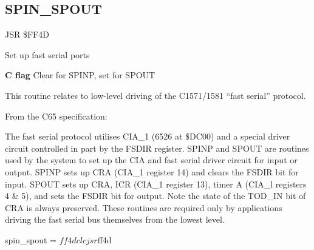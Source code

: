 \subsection{SPIN{\_}SPOUT}
\label{KERNAL Jump Table!SPIN_SPOUT}
\begin{description}[leftmargin=2cm,style=nextline]
    \item [Address:] JSR \$FF4D
    \item [Description:] Set up fast serial ports
    \item [Inputs:]
        \textbf{C flag} Clear for SPINP, set for SPOUT
    \item [Remarks:]
    This routine relates to low-level driving of the C1571/1581 ``fast serial'' protocol.

    From the C65 specification:

    The  fast serial protocol utilises CIA\_1 (6526 at \$DC00) and a special
    driver  circuit  controlled  in  part by the FSDIR register. SPINP and
    SPOUT  are  routines  used  by  the  system to set up the CIA and fast
    serial  driver  circuit  for input or output. SPINP sets up CRA (CIA\_1
    register  14)  and  clears the FSDIR bit for input. SPOUT sets up CRA,
    ICR (CIA\_1 register 13), timer A (CIA\_l registers 4 \& 5), and sets the
    FSDIR  bit  for  output.  Note  the  state of the TOD\_IN bit of CRA is
    always  preserved.  These  routines  are required only by applications
    driving the fast serial bus themselves from the lowest level.
    \item [Example:]
        \begin{asmcode}
spin_spout = $ff4d

    clc
    jsr $ff4d
        \end{asmcode}
\end{description}



\newpage
